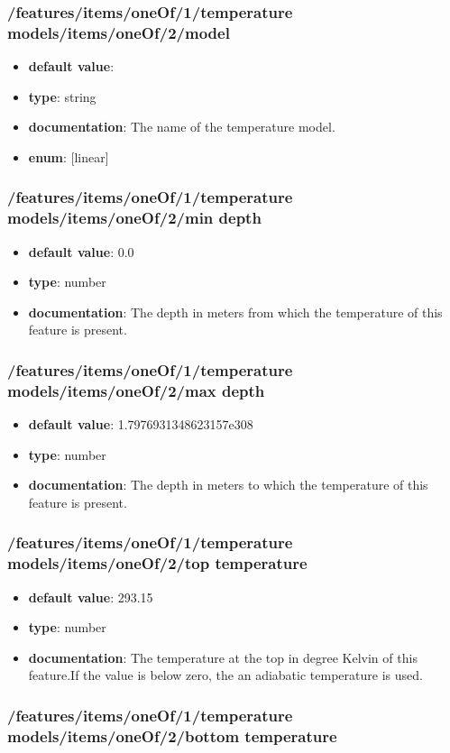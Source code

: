 \subsubsection{/features/items/oneOf/1/temperature models/items/oneOf/2/model}
\begin{itemize}\item {\bf default value}: 
\item {\bf type}: string
\item {\bf documentation}: The name of the temperature model.
\item {\bf enum}: [linear]\end{itemize}\subsubsection{/features/items/oneOf/1/temperature models/items/oneOf/2/min depth}
\begin{itemize}\item {\bf default value}: 0.0
\item {\bf type}: number
\item {\bf documentation}: The depth in meters from which the temperature of this feature is present.
\end{itemize}\subsubsection{/features/items/oneOf/1/temperature models/items/oneOf/2/max depth}
\begin{itemize}\item {\bf default value}: 1.7976931348623157e308
\item {\bf type}: number
\item {\bf documentation}: The depth in meters to which the temperature of this feature is present.
\end{itemize}\subsubsection{/features/items/oneOf/1/temperature models/items/oneOf/2/top temperature}
\begin{itemize}\item {\bf default value}: 293.15
\item {\bf type}: number
\item {\bf documentation}: The temperature at the top in degree Kelvin of this feature.If the value is below zero, the an adiabatic temperature is used.
\end{itemize}\subsubsection{/features/items/oneOf/1/temperature models/items/oneOf/2/bottom temperature}

